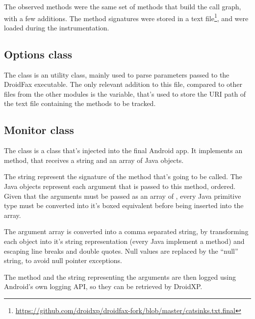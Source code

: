 The observed methods were the same set of methods that build the call graph, with a few additions. The method signatures were stored in a text file\footnote{\url{https://github.com/droidxp/droidfax-fork/blob/master/catsinks.txt.final}}, and were loaded during the instrumentation.

\subsection{Options class}

The  class is an utility class, mainly used to parse parameters passed to the DroidFax executable. The only relevant addition to this file, compared to other  files from the other modules is the  variable, that's used to store the URI path of the text file containing the methods to be tracked.

\subsection{Monitor class}

The  class is a class that's injected into the final Android app. It implements an  method, that receives a string and an array of Java objects.

The string represent the signature of the method that's going to be called. The Java objects represent each argument that is passed to this method, ordered. Given that the arguments must be passed as an array of , every Java primitive type must be converted into it's boxed equivalent before being inserted into the array.

The argument array is converted into a comma separated string, by transforming each object into it's string representation (every Java  implement a  method) and escaping line breaks and double quotes. Null values are replaced by the ``null'' string, to avoid null pointer exceptions. 

The method and the string representing the arguments are then logged using Android's own logging API, so they can be retrieved by DroidXP.

